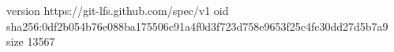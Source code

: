 version https://git-lfs.github.com/spec/v1
oid sha256:0df2b054b76e088ba175506c91a4f0d3f723d758e9653f25c4fc30dd27d5b7a9
size 13567
